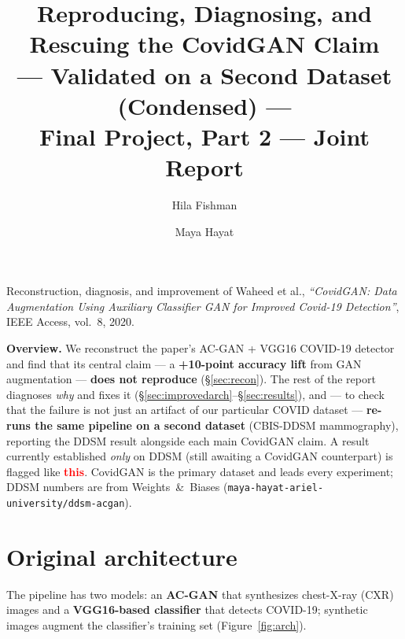 \documentclass[11pt]{article}
\title{\textbf{Reproducing, Diagnosing, and Rescuing the CovidGAN Claim}\\[2pt]
\large --- Validated on a Second Dataset (Condensed) ---\\[6pt]
\normalsize Final Project, Part 2 --- Joint Report}
\author{Hila Fishman \and Maya Hayat}
\date{}
\newcommand{\code}[1]{\texttt{#1}}
\newcommand{\ddsmonly}[1]{\textcolor{red}{\textbf{#1}}}
\begin{document}
\maketitle
\vspace{-2.0em}

\noindent
Reconstruction, diagnosis, and improvement of Waheed et al., \emph{``CovidGAN: Data
Augmentation Using Auxiliary Classifier GAN for Improved Covid-19 Detection''}, IEEE
Access, vol.~8, 2020.

\medskip
\noindent\textbf{Overview.} We reconstruct the paper's AC-GAN + VGG16 COVID-19
detector and find that its central claim --- a \textbf{+10-point accuracy lift} from
GAN augmentation --- \textbf{does not reproduce} (§\ref{sec:recon}). The rest of the
report diagnoses \emph{why} and fixes it (§\ref{sec:improvedarch}--§\ref{sec:results}),
and --- to check that the failure is not just an artifact of our particular COVID
dataset --- \textbf{re-runs the same pipeline on a second dataset} (CBIS-DDSM
mammography), reporting the DDSM result alongside each main CovidGAN claim. A result
currently established \emph{only} on DDSM (still awaiting a CovidGAN counterpart) is
flagged like \ddsmonly{this}. CovidGAN is the primary dataset and leads every
experiment; DDSM numbers are from Weights~\&~Biases
(\code{maya-hayat-ariel-university/ddsm-acgan}).

\section{Original architecture}
\label{sec:arch}
The pipeline has two models: an \textbf{AC-GAN} that synthesizes chest-X-ray (CXR)
images and a \textbf{VGG16-based classifier} that detects COVID-19; synthetic images
augment the classifier's training set (Figure~\ref{fig:arch}).
\end{document}
